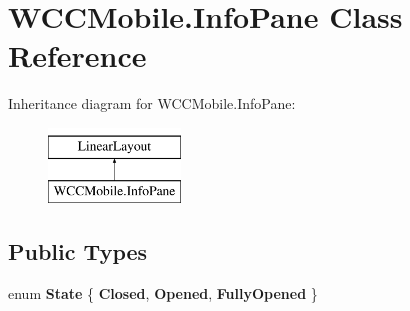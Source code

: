 \hypertarget{class_w_c_c_mobile_1_1_info_pane}{}\section{W\+C\+C\+Mobile.\+Info\+Pane Class Reference}
\label{class_w_c_c_mobile_1_1_info_pane}
Inheritance diagram for W\+C\+C\+Mobile.\+Info\+Pane\+:\begin{figure}[H]
\begin{center}
\leavevmode
\includegraphics[height=2.000000cm]{class_w_c_c_mobile_1_1_info_pane}
\end{center}
\end{figure}
\subsection*{Public Types}
\begin{DoxyCompactItemize}
\item 
enum {\bfseries State} \{ {\bfseries Closed}, 
{\bfseries Opened}, 
{\bfseries Fully\+Opened}
 \}\hypertarget{class_w_c_c_mobile_1_1_info_pane_a771339a51702ed505cd36b8c973c5153}{}\label{class_w_c_c_mobile_1_1_info_pane_a771339a51702ed505cd36b8c973c5153}

\end{DoxyCompactItemize}
